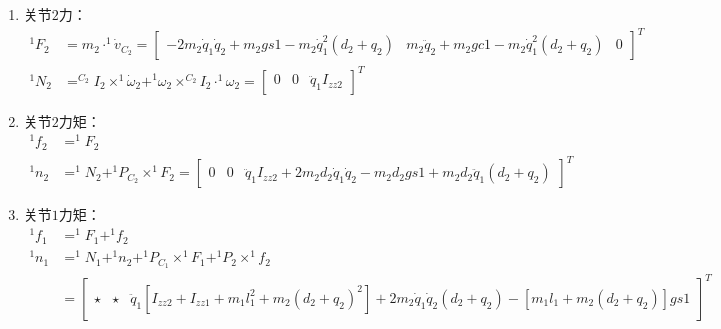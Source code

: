 \documentclass[
12pt, %
a4paper, 
oneside, %
headinclude,footinclude, %
]{scrartcl}
\begin{document}
{\begin{enumerate}
\begin{align*}
^1\dot{v}_2 &= ^1\dot{v}_1 + ^1\dot{\omega}_1 \times ^1P_2 + ^1\omega_1 \times (^1\omega_1 \times ^1P_2) + \ddot{q}_2 \cdot ^1Z_2 + 2\dot{q}_2 \cdot ^1\omega_1 \times ^1Z_2 \\
&= \begin{bmatrix} -\ddot{q}_1q_2 - 2\dot{q}_1\dot{q}_2 + gs1 & -\dot{q}_1^2q_2 + {\ddot{q}_2}^2 + gc1 & 0 \end{bmatrix}^T \\
^1\dot{v}_{C_2} &= ^1\dot{v}_2 + ^1\dot{\omega}_2 \times ^1P_{C_2} + ^1\omega_2 \times (^1\omega_2 \times ^1P_{C_2}) \\
&= \begin{bmatrix} -2\dot{q}_1\dot{q}_2 + gs1 - \ddot{q}_1(d_2 + q_2) & \ddot{q}_2 + gc1 - \dot{q}_1^2(d_2 + q_2) & 0 \end{bmatrix}^T
\end{align*}
\item 关节$ 2 $力：
\begin{align*}
^1F_2 &= m_2 \cdot ^1\dot{v}_{C_2} = \begin{bmatrix} -2m_2\dot{q}_1\dot{q}_2 + m_2gs1 - m_2\dot{q}_1^2(d_2 + q_2) & m_2\ddot{q}_2 + m_2gc1 - m_2\dot{q}_1^2(d_2 + q_2) & 0 \end{bmatrix}^T \\
^1N_2 &= ^{C_2}I_2 \times ^1\dot{\omega}_2 + ^1\omega_2 \times ^{C_2}I_2 \cdot ^1\omega_2 = \begin{bmatrix} 0 & 0 & \ddot{q}_1 I_{zz2} \end{bmatrix}^T
\end{align*}
\item 关节$ 2 $力矩：
\begin{align*}
^1f_2 &= ^1F_2 \\
^1n_2 &= ^1N_2 + ^1P_{C_2} \times ^1F_2 = \begin{bmatrix} 0 & 0 & \ddot{q}_1 I_{zz2} + 2m_2d_2\dot{q}_1\dot{q}_2 - m_2d_2gs1 + m_2d_2\ddot{q}_1(d_2 + q_2) \end{bmatrix}^T
\end{align*}
\item 关节$ 1 $力矩：
\begin{align*}
^1f_1 &= ^1F_1 + ^1f_2 \\
^1n_1 &= ^1N_1 + ^1n_2 + ^1P_{C_1} \times ^1F_1 + ^1P_2 \times ^1f_2 \\
&= \begin{bmatrix} \star & \star & \ddot{q}_1[I_{zz2} + I_{zz1} + m_1l_1^2 + m_2(d_2 + q_2)^2] + 2m_2\dot{q}_1\dot{q}_2(d_2 + q_2) - [m_1l_1 + m_2(d_2 + q_2)]gs1 \end{bmatrix}^T

\end{align*}
\end{enumerate}}
\end{document}
